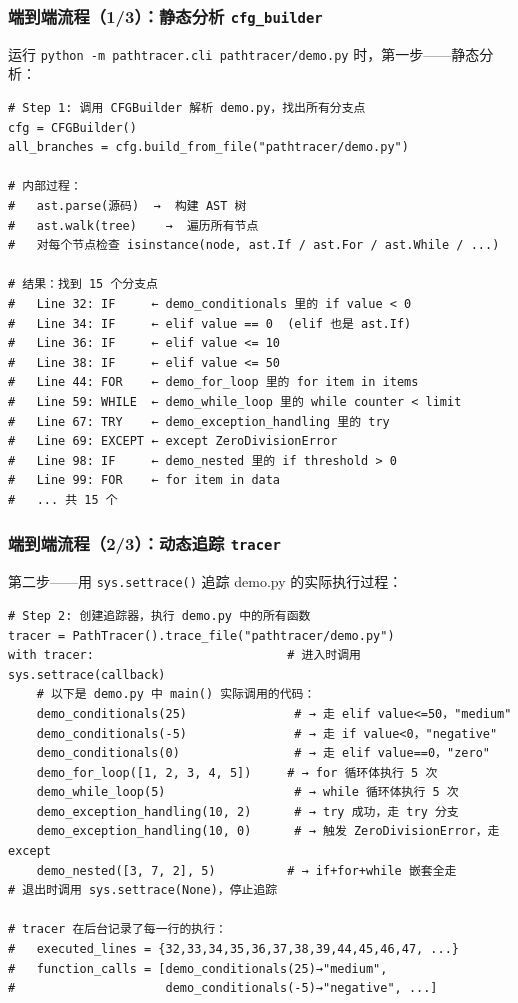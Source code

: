\documentclass[presentation,aspectratio=169,fontset=none]{ctexbeamer}
\begin{document}
\begin{frame}[fragile]
\frametitle{端到端流程（1/3）：静态分析 \texttt{cfg\_builder}}
{\scriptsize 运行 \texttt{python -m pathtracer.cli pathtracer/demo.py} 时，第一步——静态分析：}

\vspace{0.05cm}
{\tiny
\begin{verbatim}
# Step 1: 调用 CFGBuilder 解析 demo.py，找出所有分支点
cfg = CFGBuilder()
all_branches = cfg.build_from_file("pathtracer/demo.py")

# 内部过程：
#   ast.parse(源码)  →  构建 AST 树
#   ast.walk(tree)    →  遍历所有节点
#   对每个节点检查 isinstance(node, ast.If / ast.For / ast.While / ...)

# 结果：找到 15 个分支点
#   Line 32: IF     ← demo_conditionals 里的 if value < 0
#   Line 34: IF     ← elif value == 0  (elif 也是 ast.If)
#   Line 36: IF     ← elif value <= 10
#   Line 38: IF     ← elif value <= 50
#   Line 44: FOR    ← demo_for_loop 里的 for item in items
#   Line 59: WHILE  ← demo_while_loop 里的 while counter < limit
#   Line 67: TRY    ← demo_exception_handling 里的 try
#   Line 69: EXCEPT ← except ZeroDivisionError
#   Line 98: IF     ← demo_nested 里的 if threshold > 0
#   Line 99: FOR    ← for item in data
#   ... 共 15 个
\end{verbatim}}
\end{frame}


\begin{frame}[fragile]
\frametitle{端到端流程（2/3）：动态追踪 \texttt{tracer}}
{\scriptsize 第二步——用 \texttt{sys.settrace()} 追踪 demo.py 的实际执行过程：}

\vspace{0.05cm}
{\tiny
\begin{verbatim}
# Step 2: 创建追踪器，执行 demo.py 中的所有函数
tracer = PathTracer().trace_file("pathtracer/demo.py")
with tracer:                           # 进入时调用 sys.settrace(callback)
    # 以下是 demo.py 中 main() 实际调用的代码：
    demo_conditionals(25)               # → 走 elif value<=50，"medium"
    demo_conditionals(-5)               # → 走 if value<0，"negative"
    demo_conditionals(0)                # → 走 elif value==0，"zero"
    demo_for_loop([1, 2, 3, 4, 5])     # → for 循环体执行 5 次
    demo_while_loop(5)                  # → while 循环体执行 5 次
    demo_exception_handling(10, 2)      # → try 成功，走 try 分支
    demo_exception_handling(10, 0)      # → 触发 ZeroDivisionError，走 except
    demo_nested([3, 7, 2], 5)          # → if+for+while 嵌套全走
# 退出时调用 sys.settrace(None)，停止追踪

# tracer 在后台记录了每一行的执行：
#   executed_lines = {32,33,34,35,36,37,38,39,44,45,46,47, ...}
#   function_calls = [demo_conditionals(25)→"medium",
#                     demo_conditionals(-5)→"negative", ...]
\end{verbatim}}
\end{frame}
\end{document}
